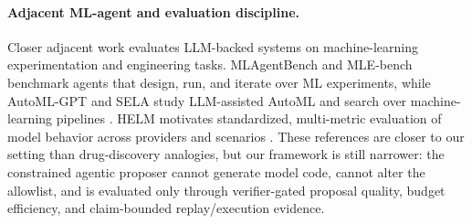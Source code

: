 \paragraph{Adjacent ML-agent and evaluation discipline.}
Closer adjacent work evaluates LLM-backed systems on machine-learning
experimentation and engineering tasks. MLAgentBench and MLE-bench benchmark
agents that design, run, and iterate over ML experiments, while AutoML-GPT and
SELA study LLM-assisted AutoML and search over machine-learning pipelines
\citep{huang2024mlagentbench,chan2025mlebench,zhang2023automlgpt,chi2024sela}.
HELM motivates standardized, multi-metric evaluation of model behavior across
providers and scenarios \citep{liang2023helm}. These references are closer to
our setting than drug-discovery analogies, but our framework is still narrower:
the constrained agentic proposer cannot generate model code, cannot alter the
allowlist, and is evaluated only through verifier-gated proposal quality,
budget efficiency, and claim-bounded replay/execution evidence.
